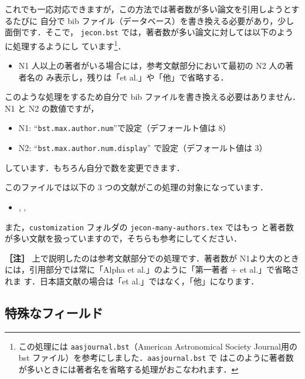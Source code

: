 \documentclass[article]{jlreq}
\newcommand{\midashii}[1]{\noindent \textbf{［#1］}}
\begin{document}
これでも一応対応できますが，この方法では著者数が多い論文を引用しようとするたびに
自分で bib ファイル（データベース）を書き換える必要があり，少し面倒です．そこで，
\texttt{jecon.bst} では，著者数が多い論文に対しては以下のように処理するようにし
ています\footnote{この処理には \texttt{aasjournal.bst}（American Astronomical
Society Journal用の bst ファイル）を参考にしました．\texttt{aasjournal.bst} で
はこのように著者数が多いときには著者名を省略する処理がおこなわれます．}．
\begin{screen}
\begin{itemize}
 \item N1 人以上の著者がいる場合には，参考文献部分において最初の N2 人の著者名の
       み表示し，残りは「et al.」や「他」で省略する．
\end{itemize}
\end{screen}
このような処理をするため自分で bib ファイルを書き換える必要はありません．N1 と
N2 の数値ですが，
\begin{itemize}
 \item N1: ``\texttt{bst.max.author.num}''で設定（デフォールト値は 8）
 \item N2: ``\texttt{bst.max.author.num.display}'' で設定（デフォールト値は 3）
\end{itemize}
しています．もちろん自分で数を変更できます．

このファイルでは以下の 3 つの文献がこの処理の対象になっています．
\begin{itemize}
 \item \citet{doi:10.1175/2009BAMS2778.1}, \citet{doi:10.1175/2009BAMS2778.1}, \citet{Li_2018}
\end{itemize}

また，\texttt{customization} フォルダの \texttt{jecon-many-authors.tex} ではもっ
と著者数が多い文献を扱っていますので，そちらも参考にしてください．

\vspace*{1em}

\midashii{注} 上で説明したのは参考文献部分での処理です．著者数が N1より大のとき
 には，引用部分では常に「Alpha et al.」のように「第一著者 + et al.」で省略されま
 す．日本語文献の場合は「et al.」ではなく，「他」になります．

\vspace*{1em}


\subsection{特殊なフィールド}
\end{document}
